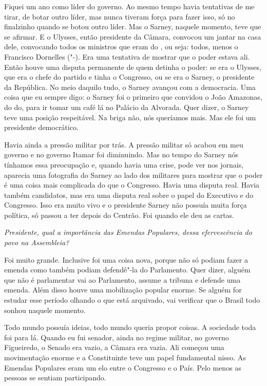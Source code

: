 Fiquei um ano como líder do governo. Ao mesmo tempo havia tentativas de
me tirar, de botar outro líder, mas nunca tiveram força para fazer isso,
só no finalzinho quando se botou outro líder. Mas o Sarney, naquele
momento, teve que se afirmar. E o Ulysses, então presidente da Câmara,
convocou um jantar na casa dele, convocando todos os ministros que eram
do , ou seja: todos, menos o Francisco Dornelles ("-). Era uma
tentativa de mostrar que o poder estava ali. Então houve uma disputa
permanente de quem detinha o poder: se era o Ulysses, que era o chefe do
partido e tinha o Congresso, ou se era o Sarney, o presidente da
República. No meio daquilo tudo, o Sarney avançou com a democracia. Uma
coisa que eu sempre digo: o Sarney foi o primeiro que convidou o João
Amazonas, do do, para ir tomar um café lá no Palácio da Alvorada.
Quer dizer, o Sarney teve uma posição respeitável. Na briga não, nós
queríamos mais. Mas ele foi um presidente democrático.

Havia ainda a pressão militar por trás. A pressão militar só acabou em
meu governo e no governo Itamar foi diminuindo. Mas no tempo do Sarney
nós tínhamos essa preocupação e, quando havia uma crise, pode ver nos
jornais, aparecia uma fotografia do Sarney ao lado dos militares para
mostrar que o poder é uma coisa mais complicada do que o Congresso.
Havia uma disputa real. Havia também candidatos, mas era uma disputa
real sobre o papel do Executivo e do Congresso. Isso era muito vivo e o
presidente Sarney não possuía muita força política, só passou a ter
depois do Centrão. Foi quando ele deu as cartas.

\medskip

\emph{Presidente, qual a importância das Emendas Populares, dessa
efervescência do povo na Assembleia? }

Foi muito grande. Inclusive foi uma coisa nova, porque não
só podiam fazer a emenda como também podiam defendê"-la do Parlamento.
Quer dizer, alguém que não é parlamentar vai ao Parlamento, assume a
tribuna e defende uma emenda. Além disso houve uma mobilização popular
enorme. Se alguém for estudar esse período olhando o que está arquivado,
vai verificar que o Brasil todo sonhou naquele momento.

Todo mundo possuía ideias, todo mundo queria propor coisas. A sociedade
toda foi para lá. Quando eu fui senador, ainda no regime militar, no
governo Figueiredo, o Senado era vazio, a Câmara era vazia. Ali começou
uma movimentação enorme e a Constituinte teve um papel fundamental
nisso. As Emendas Populares eram um elo entre o Congresso e o País. Pelo
menos as pessoas se sentiam participando.

